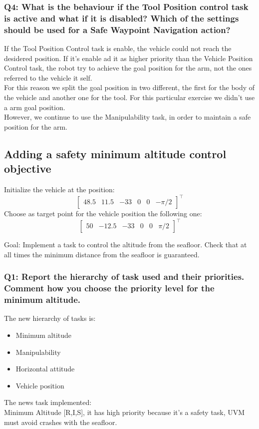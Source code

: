 \documentclass{article}
\begin{document}
\subsubsection{Q4: What is the behaviour if the Tool Position control task is active and what if it is disabled? Which of the settings should be used for a Safe Waypoint Navigation action?}
If the Tool Position Control task is enable, the vehicle could not reach the desidered position. If it's enable ad it as higher priority than the Vehicle Position Control task, the robot try to achieve the goal position for the arm, not the ones referred to the vehicle it self. \\
For this reason we split the goal position in two different, the first for the body of the vehicle and another one for the tool. For this particular exercise we didn't use a arm goal position. \\
However, we continue to use the Manipulability task, in order to maintain a safe position for the arm. %

\clearpage

\subsection{Adding a safety minimum altitude control objective}
Initialize the vehicle at the position:
\begin{displaymath}
\begin{bmatrix} 48.5 & 11.5 & -33 & 0 & 0 &-\pi/2\end{bmatrix}^\top
\end{displaymath} 
Choose as target point for the vehicle position the following one:
\begin{displaymath}
\begin{bmatrix} 50 & -12.5 & -33 & 0 & 0 & \pi/2 \end{bmatrix}^\top
\end{displaymath}

Goal: Implement a task to control the altitude from the seafloor. Check that at all times the minimum distance from the seafloor is guaranteed.

\subsubsection{Q1: Report the hierarchy of task used and their priorities. Comment how you choose the priority level for the minimum altitude.}
The new hierarchy of tasks is:
\begin{itemize}
	\item Minimum altitude
	\item Manipulability
	\item Horizontal attitude
	\item Vehicle position
\end{itemize}
The news task implemented: \\
Minimum Altitude [R,I,S], it has high priority because it's a safety task, UVM must avoid crashes with the seafloor.
\end{document}
